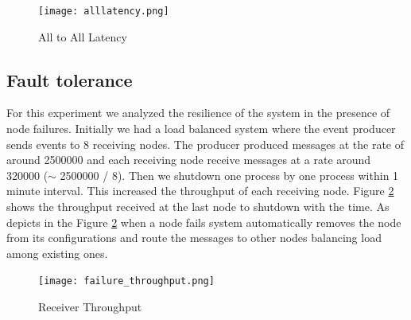 \begin{figure}[!t]
        \centering
        \texttt{[image: alllatency.png]}
        \caption{All to All Latency}
        \label{alllatency}
\end{figure}


\subsection{Fault tolerance}
For this experiment we analyzed the resilience of the system in the presence of node failures. Initially we had a load balanced system where the event producer sends events to 8 receiving nodes. The producer produced messages at the rate of around 2500000 and each receiving node receive messages at a rate around 320000 ($\sim$ 2500000 / 8). Then we shutdown one process by one process within 1 minute interval. This increased the throughput of each receiving node. Figure \ref{rthroughput} shows the throughput received at the last node to shutdown with the time. As depicts in the Figure \ref{rthroughput} when a node fails system automatically removes the node from its configurations and route the messages to other nodes balancing load among existing ones.

\begin{figure}[!t]
        \centering
        \texttt{[image: failure\_throughput.png]}
        \caption{Receiver Throughput}
        \label{rthroughput}
\end{figure}
